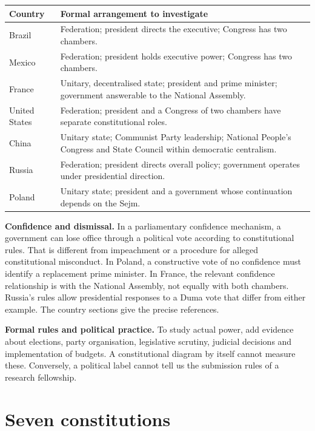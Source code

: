 \begin{center}
\begin{tabular}{p{}
p{}}
\textbf{Country} &
\textbf{Formal arrangement to investigate} \\
\hline
Brazil & Federation; president directs the
executive;
Congress has two chambers. \\
Mexico & Federation; president holds
executive power;
Congress has two chambers. \\
France & Unitary, decentralised state;
president and
prime minister; government answerable to the
National Assembly. \\
United States & Federation; president and a
Congress
of two chambers have separate constitutional
roles. \\
China & Unitary state; Communist Party
leadership;
National People's Congress and State Council
within
democratic centralism. \\
Russia & Federation; president directs
overall policy;
government operates under presidential
direction. \\
Poland & Unitary state; president and a
government
whose continuation depends on the Sejm. \\
\end{tabular}
\end{center}

\textbf{Confidence and dismissal.}
In a parliamentary confidence mechanism, a
government
can lose office through a political vote
according to
constitutional rules. That is different from
impeachment
or a procedure for alleged constitutional
misconduct.
In Poland, a constructive vote of no
confidence must
identify a replacement prime minister.
In France, the relevant confidence
relationship is with
the National Assembly, not equally with both
chambers.
Russia's rules allow presidential responses
to a Duma
vote that differ from either example.
The country sections give the precise
references.

\textbf{Formal rules and political practice.}
To study actual power, add evidence about
elections,
party organisation, legislative scrutiny,
judicial
decisions and implementation of budgets.
A constitutional diagram by itself cannot
measure these.
Conversely, a political label cannot tell us
the submission
rules of a research fellowship.

\section{Seven constitutions}
\label{section-gsf-constitutions}

